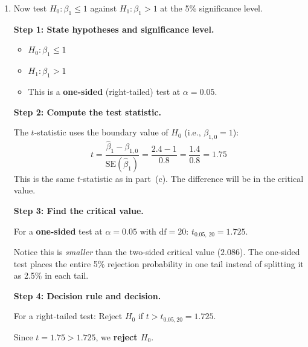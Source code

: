 \documentclass[11pt,a4paper]{article}
\begin{document}
\begin{enumerate}[label=(\alph*)]
\begin{solution}
\textbf{Step 4: Decision.}

We \textbf{fail to reject} $H_0$ at the 5\% significance level. There is not enough evidence to conclude that $\beta_1 \ne 1$.

\medskip
\textbf{Verification via $t$-test:}
\[
  t = \frac{\hat{\beta}_1 - 1}{\text{SE}(\hat{\beta}_1)} = \frac{2.4 - 1}{0.8} = \frac{1.4}{0.8} = 1.75
\]
Decision: $|t| = 1.75 < 2.086 = t_{0.025,20}$, so we fail to reject. \checkmark

Both methods (CI approach and $t$-test) give the same answer --- they are mathematically equivalent for two-sided tests.
\end{solution}

\item Now test $H_0\colon \beta_1 \le 1$ against $H_1\colon \beta_1 > 1$ at the 5\% significance level.

\begin{solution}
\textbf{Step 1: State hypotheses and significance level.}
\begin{itemize}
  \item $H_0\colon \beta_1 \le 1$
  \item $H_1\colon \beta_1 > 1$
  \item This is a \textbf{one-sided} (right-tailed) test at $\alpha = 0.05$.
\end{itemize}

\textbf{Step 2: Compute the test statistic.}

The $t$-statistic uses the boundary value of $H_0$ (i.e., $\beta_{1,0} = 1$):
\[
  t = \frac{\hat{\beta}_1 - \beta_{1,0}}{\text{SE}(\hat{\beta}_1)}
  = \frac{2.4 - 1}{0.8}
  = \frac{1.4}{0.8}
  = 1.75
\]
This is the same $t$-statistic as in part~(c). The difference will be in the critical value.

\textbf{Step 3: Find the critical value.}

For a \textbf{one-sided} test at $\alpha = 0.05$ with $\text{df} = 20$: $t_{0.05,\, 20} = 1.725$.

Notice this is \emph{smaller} than the two-sided critical value ($2.086$). The one-sided test places the entire 5\% rejection probability in one tail instead of splitting it as 2.5\% in each tail.

\textbf{Step 4: Decision rule and decision.}

For a right-tailed test: Reject $H_0$ if $t > t_{0.05, 20} = 1.725$.

Since $t = 1.75 > 1.725$, we \textbf{reject $H_0$}.


\end{solution}
\end{enumerate}
\end{document}
